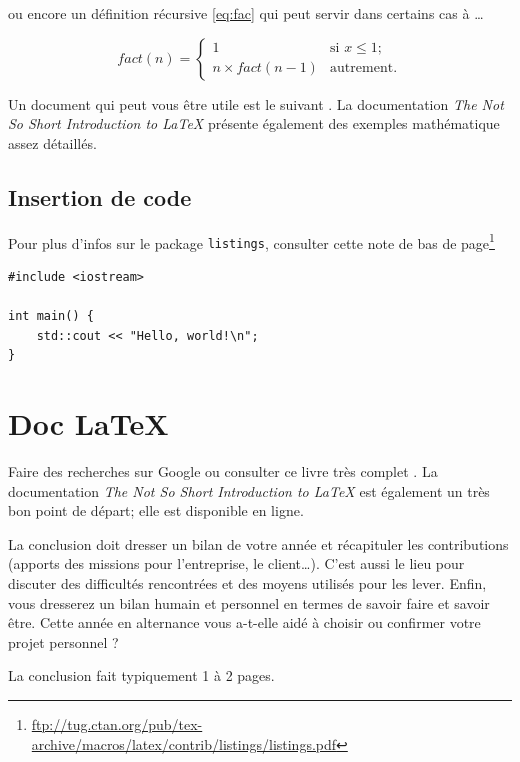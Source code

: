 \documentclass[12pt,oneside,noprintercorrection]{iut}
\begin{document}
ou encore un définition récursive \ref{eq:fac} qui peut servir dans certains cas à \ldots

\begin{equation} 
  fact(n) = \left\{ 
    \begin{array}{ll}
      1                  & \mbox{si $x \leq 1$};\\
      n \times fact(n-1) & \mbox{autrement}.
    \end{array} 
  \right.
  \label{eq:fac}
\end{equation}


Un document qui peut vous être utile est le suivant \cite{mshort}. La documentation {\em The Not So Short Introduction to \LaTeX} \cite{lshort} présente également des exemples mathématique assez détaillés.
\newpage %

\subsection{Insertion de code}

Pour plus d'infos sur le package {\tt listings}, consulter cette note de bas de page\footnote{
\url{ftp://tug.ctan.org/pub/tex-archive/macros/latex/contrib/listings/listings.pdf}

}

\begin{lstlisting}[frame=trBL]
#include <iostream>

int main() {
    std::cout << "Hello, world!\n";
}
\end{lstlisting}

\section{Doc \LaTeX}
Faire des recherches sur Google ou consulter ce livre très complet \cite{LatexCompanion}. La documentation {\em The Not So Short Introduction to \LaTeX} \cite{lshort} est également un très bon point de départ; elle est disponible en ligne.


\begin{aide}{}{}
  La conclusion doit dresser un bilan de votre année et récapituler les contributions (apports des missions pour l'entreprise, le client\dots). C'est aussi le lieu pour discuter des difficultés rencontrées et des moyens utilisés pour les lever. Enfin, vous dresserez un bilan humain et personnel en termes de savoir faire et savoir être. Cette année en alternance vous a-t-elle aidé à choisir ou confirmer votre projet personnel ?

  La conclusion fait typiquement 1 à 2 pages.
\end{aide}
\end{document}
